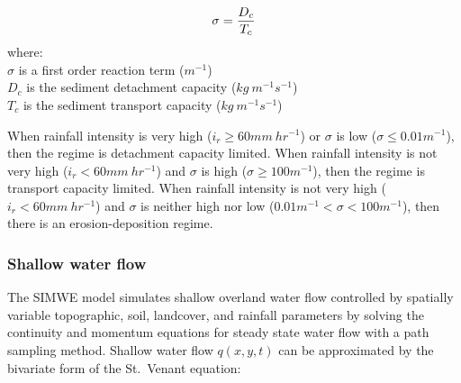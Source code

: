 \documentclass[esurf, manuscript]{copernicus}
\begin{document}
\begin{equation}
\label{eq:regime}
\sigma = {D_c \over T_c}
\end{equation}
%
{\small
\noindent
where: \\
\noindent
\hspace*{0.5em} $\sigma$  is a first order reaction term ($m^{-1}$)\\
\hspace*{0.5em} $D_c$ is the sediment detachment capacity ($kg~m^{-1}s^{-1}$)\\
\hspace*{0.5em} $T_c$ is the sediment transport capacity ($kg~m^{-1}s^{-1}$)\\
}

%

When rainfall intensity is very high ($i_r \geq 60 mm~hr^{-1}$)
or $\sigma$ is low ($\sigma \leq 0.01 m^{-1}$),
then the regime is detachment capacity limited. 
%
When rainfall intensity is not very high ($i_r < 60 mm~hr^{-1} $)
and $\sigma$ is high ($\sigma \geq 100 m^{-1}$),
then the regime is transport capacity limited. 
%
When rainfall intensity is not very high ($i_r<60 mm~hr^{-1}$)
and $\sigma$ is neither high nor low ($ 0.01 m^{-1}< \sigma < 100 m^{-1}$),
then there is an erosion-deposition regime. \\

\subsubsection{Shallow water flow}
The SIMWE model
simulates shallow overland water flow 
controlled by spatially variable topographic, soil, landcover, and rainfall parameters
by solving the continuity and momentum equations 
for steady state water flow with a path sampling method. 
Shallow water flow $q(x,y,t)$ can be approximated by
the bivariate form of the St.~Venant equation:
\end{document}
